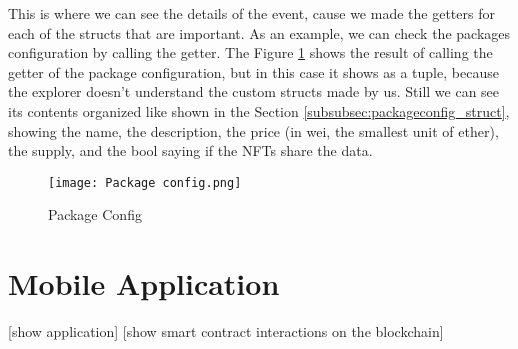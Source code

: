 This is where we can see the details of the event, cause we made the getters for each of the structs that are important. As an example, we can check the packages configuration by calling the getter. The Figure \ref{fig:package_config} shows the result of calling the getter of the package configuration, but in this case it shows as a tuple, because the explorer doesn't understand the custom structs made by us. Still we can see its contents organized like shown in the Section \ref{subsubsec:packageconfig_struct}, showing the name, the description, the price (in wei, the smallest unit of ether), the supply, and the bool saying if the NFTs share the data.

\begin{figure}[H]
    \texttt{[image: Package config.png]}
    \centering
    \caption{Package Config}
    \label{fig:package_config}
\end{figure}

\section{Mobile Application}
\label{sec:mobile_application}

[show application]
[show smart contract interactions on the blockchain]
